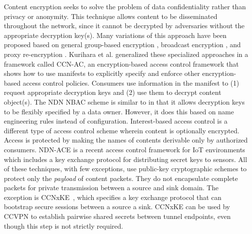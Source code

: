 Content encryption seeks to solve the problem of data confidentiality rather than
privacy or anonymity. This technique allows content to be disseminated throughout
the network, since it cannot be decrypted by adversaries without the appropriate decryption key(s).
Many variations of this approach have been proposed based on general
group-based encryption \cite{Smetters2010}, broadcast encryption \cite{Misra2013,Ion2013}, and
proxy re-encryption \cite{Wood2014}. Kurihara et al. \cite{ifip15} generalized these specialized
approaches in a framework called CCN-AC, an encryption-based access control framework
that shows how to use manifests to explicitly specify and enforce other encryption-based
access control policies. Consumers use information in the manifest to (1) request appropriate
decryption keys and (2) use them to decrypt content object(s). The NDN NBAC \cite{yu2015name}
scheme is similar to \cite{ifip15} in that it allows decryption keys to be
flexibly specified by a data owner. However, it does this based on name engineering rules instead of
configuration. Interest-based access control \cite{ghali2015interest} is a different
type of access control scheme wherein content is optionally encrypted. Access
is protected by making the names of contents derivable only by authorized consumers.
NDN-ACE \cite{shangndn} is a recent access control framework for IoT environments
which includes a key exchange protocol for distributing secret keys to sensors.
All of these techniques, with few exceptions, use public-key cryptographic schemes
to protect only the \emph{payload} of content packets. They do not encapsulate complete
packets for private transmission between a source and sink domain. The exception is CCNxKE~\cite{ccnxke},
which specifies a key exchange protocol that can bootstrap secure sessions between a source
a sink. CCNxKE can be used by CCVPN to establish pairwise shared secrets between tunnel
endpoints, even though this step is not strictly required.
